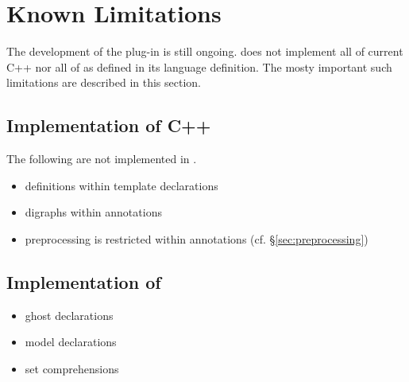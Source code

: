 \chapter{Known Limitations}

The development of the \fclang plug-in is still ongoing.
\fclang does not implement all of current C++ nor all of 
\acslpp as defined in its language definition.\cite{acslpp}
The mosty important such limitations are described in this section.

\section{Implementation of C++}

The following are not implemented in \acslpp.
\begin{itemize}
\item \acslpp definitions within template declarations
\item digraphs within \acslpp annotations
\item preprocessing is restricted within \acslpp annotations (cf. \S\ref{sec:preprocessing})
\end{itemize}

\section{Implementation of \acslpp}

\begin{itemize}

\item ghost declarations
\item model declarations
\item set comprehensions
\end{itemize}
